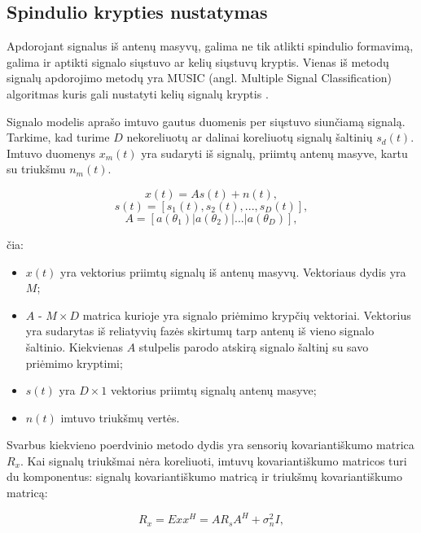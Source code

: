 \documentclass[main.tex]{subfiles}
\begin{document}
\subsection{Spindulio krypties nustatymas}\label{sec:music}

Apdorojant signalus iš antenų masyvų, galima ne tik atlikti spindulio
formavimą, galima ir aptikti signalo siųstuvo ar kelių siųstuvų kryptis.
Vienas iš metodų signalų apdorojimo metodų yra MUSIC (angl. Multiple Signal Classification)
algoritmas kuris gali nustatyti kelių signalų kryptis \cite{1143830}.

Signalo modelis aprašo imtuvo gautus duomenis per siųstuvo siunčiamą signalą. Tarkime, kad
turime $D$ nekoreliuotų ar dalinai koreliuotų signalų šaltinių $s_d(t)$. Imtuvo
duomenys $x_m(t)$ yra sudaryti iš signalų, priimtų antenų masyve, kartu su triukšmu
$n_m(t)$.

\begin{equation}
    x(t) = As(t) + n(t),
\end{equation}
\begin{equation}
    s(t) = [s_1(t), s_2(t),...,s_D(t)],
\end{equation}
\begin{equation}
    A = [a(\theta_1) | a(\theta_2) | ... | a(\theta_D)],
\end{equation}

\noindent čia:

\begin{itemize}
    \item $x(t)$ yra vektorius priimtų signalų iš antenų masyvų. Vektoriaus dydis yra $M$;
    \item $A$ - $M\times D$ matrica kurioje yra signalo priėmimo krypčių vektoriai. Vektorius
    yra sudarytas iš reliatyvių fazės skirtumų tarp antenų iš vieno signalo šaltinio. Kiekvienas
    $A$ stulpelis parodo atskirą signalo šaltinį su savo priėmimo kryptimi;
    \item $s(t)$ yra $D\times 1$ vektorius priimtų signalų antenų masyve;
    \item $n(t)$ imtuvo triukšmų vertės.
\end{itemize}

Svarbus kiekvieno poerdvinio metodo dydis yra sensorių kovariantiškumo matrica $R_x$.
Kai signalų triukšmai nėra koreliuoti, imtuvų kovariantiškumo matricos turi du komponentus:
signalų kovariantiškumo matricą ir triukšmų kovariantiškumo matricą:

\begin{equation}
    R_x = E{xx^H} = AR_sA^H + \sigma^2_n I,
\end{equation}
\end{document}
